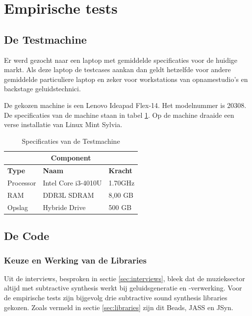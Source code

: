 \section{Empirische tests}
\label{sec:methodologie:empirischetests}

\subsection{De Testmachine}
\label{subsec:methodologie:testmachine}

Er werd gezocht naar een laptop met gemiddelde specificaties voor de huidige markt. Als deze laptop de testcases aankan dan geldt hetzelfde voor andere gemiddelde particuliere laptop en zeker voor workstations van opnamestudio's en backstage geluidstechnici.

De gekozen machine is een Lenovo Ideapad Flex-14. Het modelnummer is 20308. De specificaties van de machine staan in tabel \ref{tab:specmachine}. Op de machine draaide een verse installatie van Linux Mint Sylvia.

\begin{table}[]
\centering
\begin{tabular}{lll}
\hline
\multicolumn{3}{c}{\textbf{Component}}                \\ \hline
\textbf{Type} & \textbf{Naam}       & \textbf{Kracht} \\ \hline
Processor     & Intel Core i3-4010U & 1.70GHz         \\ \hline
RAM           & DDR3L SDRAM         & 8,00 GB         \\ \hline
Opslag        & Hybride Drive       & 500 GB
\end{tabular}
\caption{Specificaties van de Testmachine}
\label{tab:specmachine}
\end{table}

\subsection{De Code}
\label{subsec:methodologie:code}

\subsubsection{Keuze en Werking van de Libraries}

Uit de interviews, besproken in sectie \ref{sec:interviews}, bleek dat de muzieksector altijd met subtractive synthesis werkt bij geluidsgeneratie en -verwerking. Voor de empirische tests zijn bijgevolg drie subtractive sound synthesis libraries gekozen. Zoals vermeld in sectie \ref{sec:libraries} zijn dit Beads, JASS en JSyn.

